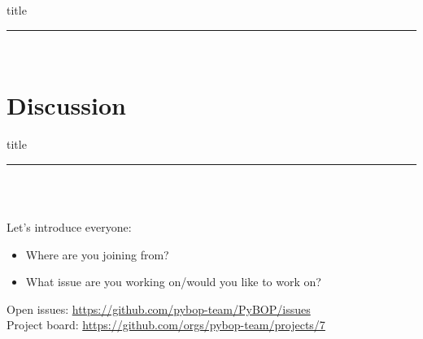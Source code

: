 \documentclass[aspectratio=169]{beamer}
\begin{document}
\begin{frame}[plain]
    \centering
    \begin{beamercolorbox}[sep=8pt,center,shadow=true,rounded=true]{title}
    \par%
    \color{oxfordblue}\noindent\rule{10cm}{1pt} \\
    \end{beamercolorbox}
\end{frame}

\section{Discussion}

\begin{frame}[plain]
    \centering
    \begin{beamercolorbox}[sep=8pt,center,shadow=true,rounded=true]{title}
    \par%
    \color{oxfordblue}\noindent\rule{10cm}{1pt} \\
    \LARGE{\faUserPlus} \LARGE{\faBug} \\
    \normalsize
    \begin{flushleft}
        Let's introduce everyone:
    \end{flushleft}
    \begin{itemize}
        \item Where are you joining from?
        \item What issue are you working on/would you like to work on?
    \end{itemize}
    \vspace{6mm} \normalsize
    Open issues: \href{https://github.com/pybop-team/PyBOP/issues}{https://github.com/pybop-team/PyBOP/issues} \\
    Project board: \href{https://github.com/orgs/pybop-team/projects/7}{https://github.com/orgs/pybop-team/projects/7}
    \end{beamercolorbox}
\end{frame}


\end{document}
